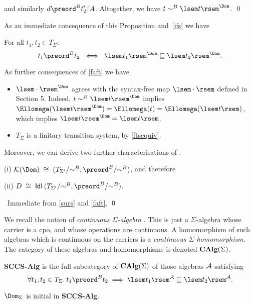 and similarly $d \preord^{B} t'_{2} {\restriction} A$.
Altogether, we have $t \sim^{B} \lsem t \rsem^{\Dom}$. \qed

As an immediate consequence of this Proposition and~\ref{ifs} we have
\begin{theorem}
\label{faft}
For all $t_{1}, t_{2} \in T_{\Sigma}$: 
\[ t_{1} \preord^{B} t_{2} \;\; \Longleftrightarrow \;\; \lsem t_{1} \rsem^{\Dom} \sqsubseteq \lsem t_{2} \rsem^{\Dom} . \]
\end{theorem}
As further consequences of \ref{faft} we have
\begin{itemize}
\item $\lsem \cdot \rsem^{\Dom}$ agrees with the syntax-free map $\lsem \cdot \rsem$ defined in Section 5.
Indeed, $t \sim^{B} \lsem t \rsem^{\Dom}$ implies $\Ellomega (\lsem t \rsem^{\Dom}) = \Ellomega (t) = \Ellomega (\lsem t \rsem )$, which implies $\lsem t \rsem^{\Dom} = \lsem t \rsem$.
\item $T_{\Sigma}$ is a finitary transition system, by \ref{ftsequiv}.
\end{itemize}
Moreover, we can derive two further characterisations of \Dom.
\begin{theorem}
(i) ${\cal K}(\Dom ) \; \cong \; (T_{\Sigma'}/{\sim^{B}}, {\preord^{B}}/{\sim^{B}})$, and therefore

\noindent (ii) $D \; \cong \; {\sf Idl} \: (T_{\Sigma'}/{\sim^{B}}, {\preord^{B}}/{\sim^{B}})$.
\end{theorem}

\proof\ Immediate from \ref{surs} and \ref{faft}. \qed

We recall the notion of {\em continuous $\Sigma$-algebra} \cite{ADJ78,Gue81}.
This is just a $\Sigma$-algebra whose carrier is a cpo, and whose operations are continuous.
A homomorphism of such algebras which is continuous on the carriers is 
a {\em continuous $\Sigma$-homomorphism}.
The category of these algebras and homomorphisms is denoted ${\bf CAlg}(\Sigma )$.
\begin{definition}
{\rm {\bf SCCS-Alg} is the full subcategory of ${\bf CAlg}(\Sigma )$ of those algebras ${\cal A}$ satisfying
\[ \forall t_{1}, t_{2} \in T_{\Sigma}. \: t_{1} \preord^{B} t_{2} \; \Longrightarrow \; \lsem t_{1} \rsem^{\cal A} \sqsubseteq \lsem t_{2} \rsem^{\cal A} . \] }
\end{definition}

\begin{theorem}
\label{binit}
$\Dom_{\Sigma}$ is initial in {\bf SCCS-Alg}.
\end{theorem}

